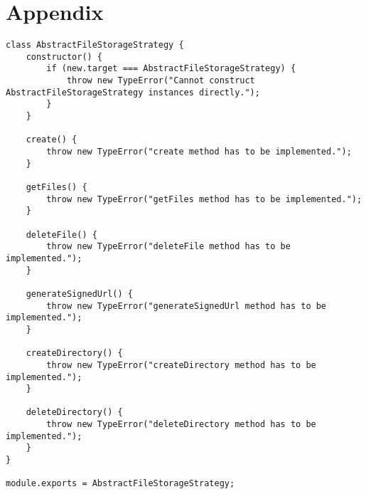 \appendix
\section{Appendix}
\label{sec:appendix}

\begin{lstlisting}[caption=Abstract file storage strategy, label=strategyinterface]
class AbstractFileStorageStrategy {
	constructor() {
		if (new.target === AbstractFileStorageStrategy) {
			throw new TypeError("Cannot construct AbstractFileStorageStrategy instances directly.");
		}
	}
	
	create() {
		throw new TypeError("create method has to be implemented.");
	}
	
	getFiles() {
		throw new TypeError("getFiles method has to be implemented.");
	}
	
	deleteFile() {
		throw new TypeError("deleteFile method has to be implemented.");
	}
	
	generateSignedUrl() {
		throw new TypeError("generateSignedUrl method has to be implemented.");
	}
	
	createDirectory() {
		throw new TypeError("createDirectory method has to be implemented.");
	}
	
	deleteDirectory() {
		throw new TypeError("deleteDirectory method has to be implemented.");
	}
}

module.exports = AbstractFileStorageStrategy;
\end{lstlisting}

\clearpage